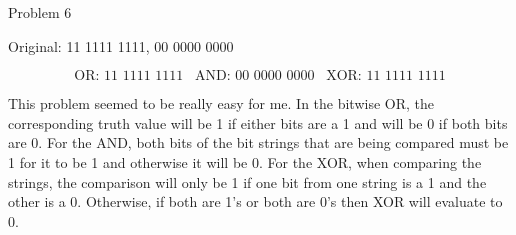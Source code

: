 \begin{problem}{Problem 6}
    \begin{Highlight}
        Original: 11 1111 1111, 00 0000 0000

        \begin{equation}
            \text{OR: 11 1111 1111} \hspace{10pt} \text{AND: 00 0000 0000} \hspace{10pt} \text{XOR: 11 1111 1111}
        \end{equation}
    \end{Highlight}

    \begin{Highlight}
        This problem seemed to be really easy for me. In the bitwise OR, the corresponding truth value will be 1 if either bits are a 1 and will be 0 if both bits are 0. For the AND, both bits of the bit strings that are being 
        compared must be 1 for it to be 1 and otherwise it will be 0. For the XOR, when comparing the strings, the comparison will only be 1 if one bit from one string is a 1 and the other is a 0. Otherwise, if both are 1's or 
        both are 0's then XOR will evaluate to 0.
    \end{Highlight}
\end{problem}


